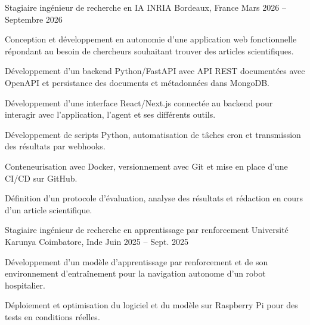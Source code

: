 
\begin{cventries}
  \cventry
    {Stagiaire ingénieur de recherche en IA}
    {INRIA}
    {Bordeaux, France}
    {Mars 2026 -- Septembre 2026}
    {
      \begin{cvitems}
        \item {Conception et développement en autonomie d’une application web fonctionnelle répondant au besoin de chercheurs souhaitant trouver des articles scientifiques.}
        \item {Développement d’un backend Python/FastAPI avec API REST documentées avec OpenAPI et persistance des documents et métadonnées dans MongoDB.}
        \item {Développement d’une interface React/Next.js connectée au backend pour interagir avec l’application, l’agent et ses différents outils.}
        \item {Développement de scripts Python, automatisation de tâches cron et transmission des résultats par webhooks.}
        \item {Conteneurisation avec Docker, versionnement avec Git et mise en place d’une CI/CD sur GitHub.}
        \item {Définition d’un protocole d’évaluation, analyse des résultats et rédaction en cours d’un article scientifique.}
      \end{cvitems}
    }

  \cventry
    {Stagiaire ingénieur de recherche en apprentissage par renforcement}
    {Université Karunya}
    {Coimbatore, Inde}
    {Juin 2025 -- Sept. 2025}
    {
      \begin{cvitems}
        \item {Développement d’un modèle d’apprentissage par renforcement et de son environnement d’entraînement pour la navigation autonome d’un robot hospitalier.}
        \item {Déploiement et optimisation du logiciel et du modèle sur Raspberry Pi pour des tests en conditions réelles.}
      \end{cvitems}
    }
\end{cventries}
